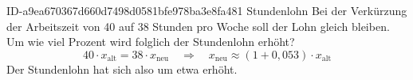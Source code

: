 \begin{exercise}
      {ID-a9ea670367d660d7498d0581bfe978ba3e8fa481}
      {Stundenlohn}
  \ifproblem\problem
    Bei der Verkürzung der Arbeitszeit von 40 auf 38 Stunden pro Woche
    soll der Lohn gleich bleiben. Um wie viel Prozent wird folglich der
    Stundenlohn erhöht?
  \fi
  \ifoutcome\outcome
    \begin{equation*}
      40\cdot x_{\text{alt}}=38\cdot x_{\text{neu}}
      \quad\Rightarrow\quad
      x_{\text{neu}}\approx(1+0,\!053)\cdot x_{\text{alt}}
    \end{equation*}
    Der Stundenlohn hat sich also um etwa  erhöht.
  \fi
\end{exercise}
